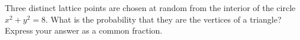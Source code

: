 Three distinct lattice points are chosen at random from the interior of the circle $x^2+y^2=8$. What is the probability that they are the vertices of a triangle? Express your answer as a common fraction.
